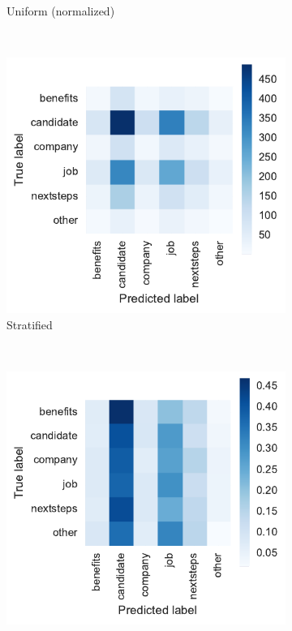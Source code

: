 \begin{figure}[h]
\begin{subfigure}[b]{0.48\textwidth}
        \caption{Uniform (normalized)}
        \label{fig:exp-vector-space-conf-matrix-guessing-uniform-normalized}
    \end{subfigure}
    ~
    \begin{subfigure}[b]{0.47\textwidth}
        \includegraphics[width=\textwidth]{img/exp-vector-space-conf-matrix-guessing-stratified.pdf}
        \caption{Stratified}
        \label{fig:exp-vector-space-conf-matrix-guessing-stratified}
    \end{subfigure}
    ~
    \begin{subfigure}[b]{0.48\textwidth}
        \includegraphics[width=\textwidth]{img/exp-vector-space-conf-matrix-guessing-stratified-normalized.pdf}

\end{subfigure}
\end{figure}

